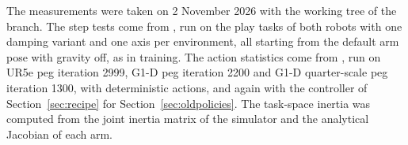 The measurements were taken on 2 November 2026 with the working tree of the  branch. The step tests come from , run on the play tasks of both robots with one damping variant and one axis per environment, all starting from the default arm pose with gravity off, as in training. The action statistics come from , run on UR5e peg iteration 2999, G1-D peg iteration 2200 and G1-D quarter-scale peg iteration 1300, with deterministic actions, and again with the controller of Section~\ref{sec:recipe} for Section~\ref{sec:oldpolicies}. The task-space inertia was computed from the joint inertia matrix of the simulator and the analytical Jacobian of each arm.
